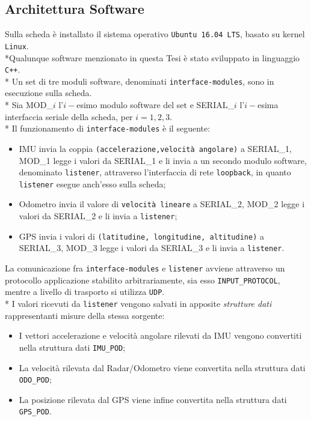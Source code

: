\subsection{Architettura Software}
Sulla scheda \`e installato il sistema operativo \texttt{Ubuntu 16.04 LTS}, basato su kernel \texttt{Linux}.\\*Qualunque software menzionato in questa Tesi \`e stato sviluppato in linguaggio \texttt{C++}.\\*
Un set di tre moduli software, denominati \texttt{interface-modules}, sono in esecuzione sulla scheda.\\*
Sia MOD\_$i$ l'$i-$esimo modulo software del set e SERIAL\_$i$ l'$i-$esima interfaccia seriale della scheda, per $i = 1,2,3$.\\*
Il funzionamento di \texttt{interface-modules} \`e il seguente:
\begin{itemize}
	\item IMU invia la coppia \texttt{(accelerazione,velocit\`a angolare)} a SERIAL\_1, MOD\_1 legge i valori da SERIAL\_1 e li invia a un secondo modulo software, denominato \texttt{listener}, attraverso l'interfaccia di rete \texttt{loopback}, in quanto \texttt{listener} esegue anch'esso sulla scheda;
	\item Odometro invia il valore di \texttt{velocit\`a lineare} a SERIAL\_2, MOD\_2 legge i valori da SERIAL\_2 e li invia a \texttt{listener};
	\item GPS invia i valori di \texttt{(latitudine, longitudine, altitudine)} a SERIAL\_3, MOD\_3 legge i valori da SERIAL\_3 e li invia a \texttt{listener}.
\end{itemize}
La comunicazione fra \texttt{interface-modules} e \texttt{listener} avviene attraverso un protocollo applicazione stabilito arbitrariamente, sia esso \texttt{INPUT\_PROTOCOL}, mentre a livello di trasporto si utilizza \texttt{UDP}.\\*
I valori ricevuti da \texttt{listener} vengono salvati in apposite \emph{strutture dati} rappresentanti misure della stessa sorgente:
\begin{itemize}
\item I vettori accelerazione e velocit\`a angolare rilevati da IMU vengono convertiti nella struttura dati \texttt{IMU\_POD};
\item La velocit\`a rilevata dal Radar/Odometro viene convertita nella struttura dati \texttt{ODO\_POD};
\item La posizione rilevata dal GPS viene infine convertita nella struttura dati \texttt{GPS\_POD}.
\end{itemize}

